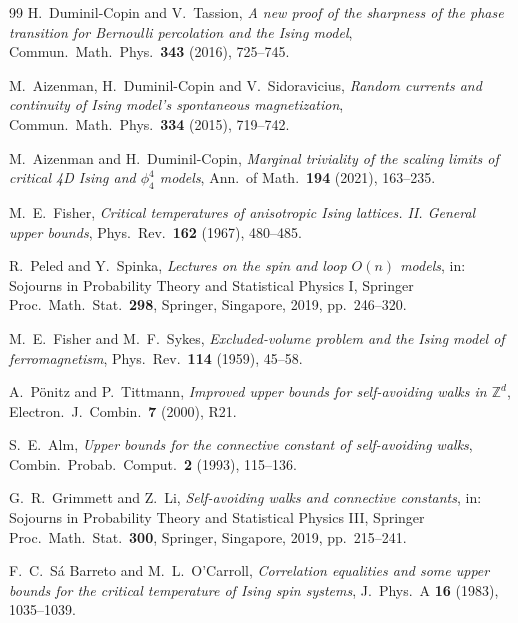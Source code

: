 \begin{thebibliography}{99}
H.~Duminil-Copin and V.~Tassion,
\emph{A new proof of the sharpness of the phase transition for Bernoulli percolation and the Ising model},
Commun.\ Math.\ Phys.\ \textbf{343} (2016), 725--745. 

M.~Aizenman, H.~Duminil-Copin and V.~Sidoravicius,
\emph{Random currents and continuity of Ising model's spontaneous magnetization},
Commun.\ Math.\ Phys.\ \textbf{334} (2015), 719--742. 

M.~Aizenman and H.~Duminil-Copin,
\emph{Marginal triviality of the scaling limits of critical 4D Ising and $\phi^4_4$ models},
Ann.\ of Math.\ \textbf{194} (2021), 163--235. 

M.~E.~Fisher,
\emph{Critical temperatures of anisotropic Ising lattices. II. General upper bounds},
Phys.\ Rev.\ \textbf{162} (1967), 480--485. 

R.~Peled and Y.~Spinka,
\emph{Lectures on the spin and loop $O(n)$ models},
in: Sojourns in Probability Theory and Statistical Physics I, Springer Proc.\ Math.\ Stat.\ \textbf{298}, Springer, Singapore, 2019, pp.~246--320. 

M.~E.~Fisher and M.~F.~Sykes,
\emph{Excluded-volume problem and the Ising model of ferromagnetism},
Phys.\ Rev.\ \textbf{114} (1959), 45--58. 

A.~P\"onitz and P.~Tittmann,
\emph{Improved upper bounds for self-avoiding walks in $\mathbb Z^d$},
Electron.\ J.\ Combin.\ \textbf{7} (2000), R21. 

S.~E.~Alm,
\emph{Upper bounds for the connective constant of self-avoiding walks},
Combin.\ Probab.\ Comput.\ \textbf{2} (1993), 115--136. 

G.~R.~Grimmett and Z.~Li,
\emph{Self-avoiding walks and connective constants},
in: Sojourns in Probability Theory and Statistical Physics III, Springer Proc.\ Math.\ Stat.\ \textbf{300}, Springer, Singapore, 2019, pp.~215--241. 

F.~C.~S\'a Barreto and M.~L.~O'Carroll,
\emph{Correlation equalities and some upper bounds for the critical temperature of Ising spin systems},
J.\ Phys.\ A \textbf{16} (1983), 1035--1039. 


\end{thebibliography}

